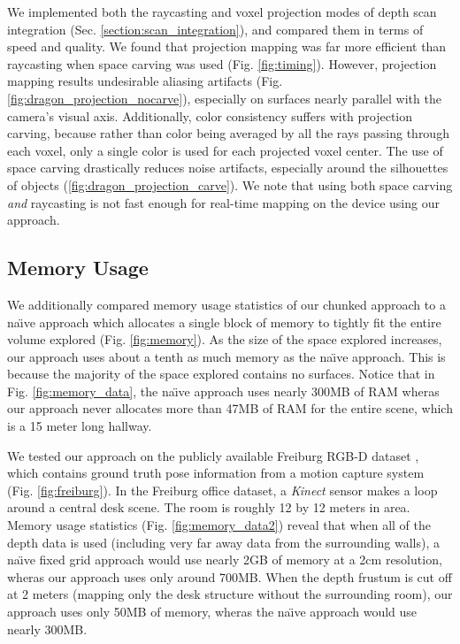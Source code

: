 \documentclass[10pt,twocolumn,letterpaper]{article}
\begin{document}
We implemented both the raycasting and voxel projection modes of depth scan
integration (Sec. \ref{section:scan_integration}), and compared them in terms of
speed and quality. We found that projection mapping was far more efficient than
raycasting when space carving was used (Fig. \ref{fig:timing}). However,
projection mapping results undesirable aliasing artifacts
(Fig. \ref{fig:dragon_projection_nocarve}), especially on surfaces nearly
parallel with the camera's visual axis. Additionally, color consistency suffers
with projection carving, because rather than color being averaged by all the
rays passing through each voxel, only a single color is used for each projected
voxel center. The use of space carving drastically reduces noise artifacts,
especially around the silhouettes of objects
(\ref{fig:dragon_projection_carve}). We note that using both space carving
\emph{and} raycasting is not fast enough for real-time mapping on the device
using our approach.

\subsection{Memory Usage}
We additionally compared memory usage statistics of our chunked approach to a
na\"{\i}ve approach which allocates a single block of memory to tightly fit the
entire volume explored (Fig. \ref{fig:memory}). As the size of the space
explored increases, our approach uses about a tenth as much memory as the
na\"{\i}ve approach. This is because the majority of the space explored contains no
surfaces. Notice that in Fig. \ref{fig:memory_data}, the na\"{\i}ve approach uses
nearly 300MB of RAM wheras our approach never allocates more than 47MB of RAM
for the entire scene, which is a 15 meter long hallway.

We tested our approach on the publicly available Freiburg RGB-D dataset
\cite{FREIBURG}, which contains ground truth pose information from a motion
capture system (Fig. \ref{fig:freiburg}). In the Freiburg office dataset, a
\textit{Kinect} sensor makes a loop around a central desk scene. The room is
roughly 12 by 12 meters in area.  Memory usage statistics (Fig.
\ref{fig:memory_data2}) reveal that when all of the depth data is used
(including very far away data from the surrounding walls), a na\"{\i}ve fixed grid
approach would use nearly 2GB of memory at a 2cm resolution, wheras our
approach uses only around 700MB. When the depth frustum is cut off at 2 meters
(mapping only the desk structure without the surrounding room), our approach
uses only 50MB of memory, wheras the na\"{\i}ve approach would use nearly 300MB.
\end{document}
